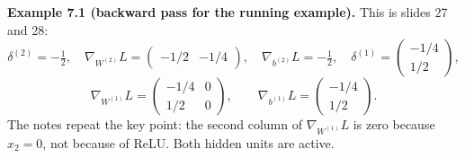 \textbf{Example 7.1 (backward pass for the running example).} This is slides 27 and 28:
\[
\delta^{(2)}=-\tfrac12, \quad \nabla_{W^{(2)}}L=\begin{pmatrix}-1/2&-1/4\end{pmatrix}, \quad \nabla_{b^{(2)}}L=-\tfrac12, \quad \delta^{(1)}=\begin{pmatrix}-1/4\\1/2\end{pmatrix},
\]
\[
\nabla_{W^{(1)}}L=\begin{pmatrix}-1/4&0\\1/2&0\end{pmatrix}, \qquad \nabla_{b^{(1)}}L=\begin{pmatrix}-1/4\\1/2\end{pmatrix}.
\]
The notes repeat the key point: the second column of $\nabla_{W^{(1)}}L$ is zero because $x_2=0$, not because of ReLU. Both hidden units are active.

